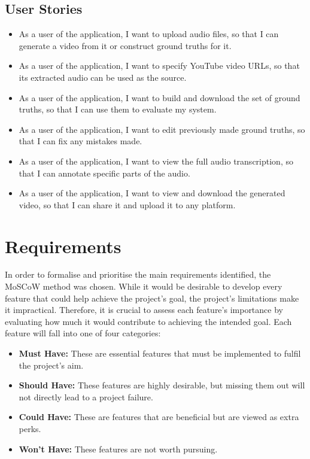 \documentclass{l4proj}
\begin{document}
\subsection{User Stories}
\begin{itemize}
    \item As a user of the application, I want to upload audio files, so that I can generate a video from it or construct ground truths for it.
    \item As a user of the application, I want to specify YouTube video URLs, so that its extracted audio can be used as the source.
    \item As a user of the application, I want to build and download the set of ground truths, so that I can use them to evaluate my system.
    \item As a user of the application, I want to edit previously made ground truths, so that I can fix any mistakes made.
    \item As a user of the application, I want to view the full audio transcription, so that I can annotate specific parts of the audio.
    \item As a user of the application, I want to view and download the generated video, so that I can share it and upload it to any platform.
\end{itemize}


\section{Requirements}
In order to formalise and prioritise the main requirements identified, the MoSCoW method \citep{clegg1994moscow} was chosen. While it would be desirable to develop every feature that could help achieve the project's goal, the project's limitations make it impractical. Therefore, it is crucial to assess each feature's importance by evaluating how much it would contribute to achieving the intended goal. Each feature will fall into one of four categories:

\begin{itemize}
    \item \textbf{Must Have:} These are essential features that must be implemented to fulfil the project's aim.
    \item \textbf{Should Have:} These features are highly desirable, but missing them out will not directly lead to a project failure.
    \item \textbf{Could Have:} These are features that are beneficial but are viewed as extra perks.
    \item \textbf{Won't Have:} These features are not worth pursuing.
\end{itemize}
\end{document}
